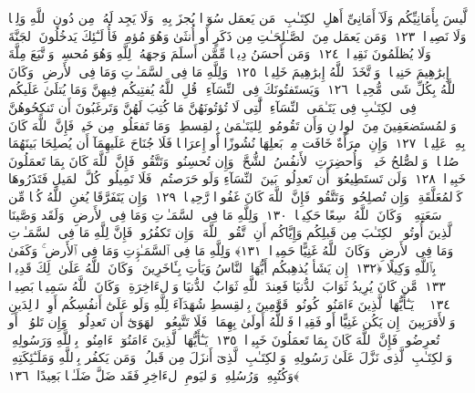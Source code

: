  لَّيسَ بِأَمَانِيِّكُم وَلَآ أَمَانِىِّ أَهلِ ٱلكِتَـٰبِ ۗ مَن يَعمَل سُوٓءًۭا يُجزَ بِهِۦ وَلَا يَجِد لَهُۥ مِن دُونِ ٱللَّهِ وَلِيًّۭا وَلَا نَصِيرًۭا ﴿١٢٣﴾
 وَمَن يَعمَل مِنَ ٱلصَّـٰلِحَـٰتِ مِن ذَكَرٍ أَو أُنثَىٰ وَهُوَ مُؤمِنٌۭ فَأُو۟لَـٰٓئِكَ يَدخُلُونَ ٱلجَنَّةَ وَلَا يُظلَمُونَ نَقِيرًۭا ﴿١٢٤﴾
 وَمَن أَحسَنُ دِينًۭا مِّمَّن أَسلَمَ وَجهَهُۥ لِلَّهِ وَهُوَ مُحسِنٌۭ وَٱتَّبَعَ مِلَّةَ إِبرَٰهِيمَ حَنِيفًۭا ۗ وَٱتَّخَذَ ٱللَّهُ إِبرَٰهِيمَ خَلِيلًۭا ﴿١٢٥﴾
 وَلِلَّهِ مَا فِى ٱلسَّمَـٰوَٟتِ وَمَا فِى ٱلأَرضِ ۚ وَكَانَ ٱللَّهُ بِكُلِّ شَىءٍۢ مُّحِيطًۭا ﴿١٢٦﴾
 وَيَستَفتُونَكَ فِى ٱلنِّسَآءِ ۖ قُلِ ٱللَّهُ يُفتِيكُم فِيهِنَّ وَمَا يُتلَىٰ عَلَيكُم فِى ٱلكِتَـٰبِ فِى يَتَـٰمَى ٱلنِّسَآءِ ٱلَّٰتِى لَا تُؤتُونَهُنَّ مَا كُتِبَ لَهُنَّ وَتَرغَبُونَ أَن تَنكِحُوهُنَّ وَٱلمُستَضعَفِينَ مِنَ ٱلوِلدَٟنِ وَأَن تَقُومُوا۟ لِليَتَـٰمَىٰ بِٱلقِسطِ ۚ وَمَا تَفعَلُوا۟ مِن خَيرٍۢ فَإِنَّ ٱللَّهَ كَانَ بِهِۦ عَلِيمًۭا ﴿١٢٧﴾
 وَإِنِ ٱمرَأَةٌ خَافَت مِنۢ بَعلِهَا نُشُوزًا أَو إِعرَاضًۭا فَلَا جُنَاحَ عَلَيهِمَآ أَن يُصلِحَا بَينَهُمَا صُلحًۭا ۚ وَٱلصُّلحُ خَيرٌۭ ۗ وَأُحضِرَتِ ٱلأَنفُسُ ٱلشُّحَّ ۚ وَإِن تُحسِنُوا۟ وَتَتَّقُوا۟ فَإِنَّ ٱللَّهَ كَانَ بِمَا تَعمَلُونَ خَبِيرًۭا ﴿١٢٨﴾
 وَلَن تَستَطِيعُوٓا۟ أَن تَعدِلُوا۟ بَينَ ٱلنِّسَآءِ وَلَو حَرَصتُم ۖ فَلَا تَمِيلُوا۟ كُلَّ ٱلمَيلِ فَتَذَرُوهَا كَٱلمُعَلَّقَةِ ۚ وَإِن تُصلِحُوا۟ وَتَتَّقُوا۟ فَإِنَّ ٱللَّهَ كَانَ غَفُورًۭا رَّحِيمًۭا ﴿١٢٩﴾
 وَإِن يَتَفَرَّقَا يُغنِ ٱللَّهُ كُلًّۭا مِّن سَعَتِهِۦ ۚ وَكَانَ ٱللَّهُ وَٟسِعًا حَكِيمًۭا ﴿١٣٠﴾
 وَلِلَّهِ مَا فِى ٱلسَّمَـٰوَٟتِ وَمَا فِى ٱلأَرضِ ۗ وَلَقَد وَصَّينَا ٱلَّذِينَ أُوتُوا۟ ٱلكِتَـٰبَ مِن قَبلِكُم وَإِيَّاكُم أَنِ ٱتَّقُوا۟ ٱللَّهَ ۚ وَإِن تَكفُرُوا۟ فَإِنَّ لِلَّهِ مَا فِى ٱلسَّمَـٰوَٟتِ وَمَا فِى ٱلأَرضِ ۚ وَكَانَ ٱللَّهُ غَنِيًّا حَمِيدًۭا ﴿١٣١﴾
 وَلِلَّهِ مَا فِى ٱلسَّمَـٰوَٟتِ وَمَا فِى ٱلأَرضِ ۚ وَكَفَىٰ بِٱللَّهِ وَكِيلًا ﴿١٣٢﴾
 إِن يَشَأ يُذهِبكُم أَيُّهَا ٱلنَّاسُ وَيَأتِ بِـَٔاخَرِينَ ۚ وَكَانَ ٱللَّهُ عَلَىٰ ذَٟلِكَ قَدِيرًۭا ﴿١٣٣﴾
 مَّن كَانَ يُرِيدُ ثَوَابَ ٱلدُّنيَا فَعِندَ ٱللَّهِ ثَوَابُ ٱلدُّنيَا وَٱلءَاخِرَةِ ۚ وَكَانَ ٱللَّهُ سَمِيعًۢا بَصِيرًۭا ﴿١٣٤﴾
 ۞ يَـٰٓأَيُّهَا ٱلَّذِينَ ءَامَنُوا۟ كُونُوا۟ قَوَّٰمِينَ بِٱلقِسطِ شُهَدَآءَ لِلَّهِ وَلَو عَلَىٰٓ أَنفُسِكُم أَوِ ٱلوَٟلِدَينِ وَٱلأَقرَبِينَ ۚ إِن يَكُن غَنِيًّا أَو فَقِيرًۭا فَٱللَّهُ أَولَىٰ بِهِمَا ۖ فَلَا تَتَّبِعُوا۟ ٱلهَوَىٰٓ أَن تَعدِلُوا۟ ۚ وَإِن تَلوُۥٓا۟ أَو تُعرِضُوا۟ فَإِنَّ ٱللَّهَ كَانَ بِمَا تَعمَلُونَ خَبِيرًۭا ﴿١٣٥﴾
 يَـٰٓأَيُّهَا ٱلَّذِينَ ءَامَنُوٓا۟ ءَامِنُوا۟ بِٱللَّهِ وَرَسُولِهِۦ وَٱلكِتَـٰبِ ٱلَّذِى نَزَّلَ عَلَىٰ رَسُولِهِۦ وَٱلكِتَـٰبِ ٱلَّذِىٓ أَنزَلَ مِن قَبلُ ۚ وَمَن يَكفُر بِٱللَّهِ وَمَلَـٰٓئِكَتِهِۦ وَكُتُبِهِۦ وَرُسُلِهِۦ وَٱليَومِ ٱلءَاخِرِ فَقَد ضَلَّ ضَلَـٰلًۢا بَعِيدًا ﴿١٣٦﴾
